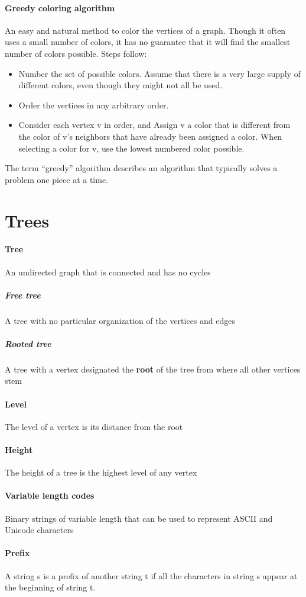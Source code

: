 \documentclass[a4paper]{article}
\begin{document}
  \paragraph{Greedy coloring algorithm} An easy and natural method to color the vertices of a graph. Though it often uses a small number of colors, it has no guarantee that it will find the smallest number of colors possible. Steps follow:
  \begin{itemize}
    \item Number the set of possible colors. Assume that there is a very large supply of different colors, even though they might not all be used.
    \item Order the vertices in any arbitrary order.
    \item Consider each vertex v in order, and Assign v a color that is different from the color of v's neighbors that have already been assigned a color. When selecting a color for v, use the lowest numbered color possible.
  \end{itemize}
  The term ``greedy'' algorithm describes an algorithm that typically solves a problem one piece at a time.
  \pagebreak
  \section{Trees}
  \paragraph{Tree} An undirected graph that is connected and has no cycles
  \subparagraph{Free tree} A tree with no particular organization of the vertices and edges
  \subparagraph{Rooted tree} A tree with a vertex designated the \textbf{root} of the tree from where all other vertices stem
  \paragraph{Level} The level of a vertex is its distance from the root
  \paragraph{Height} The height of a tree is the highest level of any vertex
  \paragraph{Variable length codes} Binary strings of variable length that can be used to represent ASCII and Unicode characters
  \paragraph{Prefix} A string s is a prefix of another string t if all the characters in string s appear at the beginning of string t.
\end{document}
